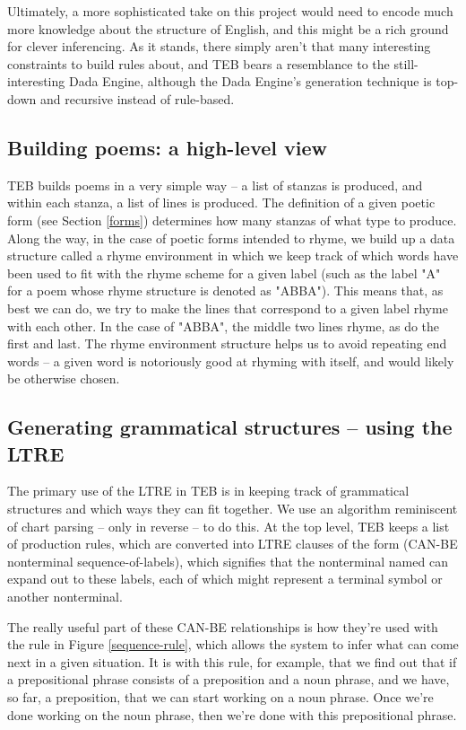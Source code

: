 \documentclass[12pt]{article}
\begin{document}
Ultimately, a more sophisticated take on this project would need to
encode much more knowledge about the structure of English, and this might
be a rich ground for clever inferencing. As it stands, there simply aren't
that many interesting constraints to build rules about, and TEB bears a
resemblance to the still-interesting Dada Engine\cite{dadaengine},
although the Dada Engine's generation technique is top-down and recursive
instead of rule-based.

\subsection{Building poems: a high-level view}
TEB builds poems in a very simple way -- a list of stanzas is produced, and
within each stanza, a list of lines is produced. The definition of a given
poetic form (see Section \ref{forms}) determines how many stanzas of what
type to produce. Along the way, in the case of poetic forms intended to
rhyme, we build up a data structure called a rhyme environment in which we
keep track of which words have been used to fit with the rhyme scheme for a
given label (such as the label "A" for a poem whose rhyme structure is
denoted as "ABBA"). This means that, as best we can do, we try to make the
lines that correspond to a given label rhyme with each other. In the case
of "ABBA", the middle two lines rhyme, as do the first and last. The rhyme
environment structure helps us to avoid repeating end words -- a given word
is notoriously good at rhyming with itself, and would likely be otherwise
chosen.

\subsection{Generating grammatical structures -- using the LTRE}
\label{generating}
The primary use of the LTRE in TEB is in keeping track of grammatical
structures and which ways they can fit together. We use an algorithm
reminiscent of chart parsing -- only in reverse -- to do this. At the top
level, TEB keeps a list of production rules, which are converted into LTRE
clauses of the form (CAN-BE nonterminal sequence-of-labels), which
signifies that the nonterminal named can expand out to these labels, each
of which might represent a terminal symbol or another nonterminal.

\bigskip
The really useful part of these CAN-BE relationships is how they're used
with the rule in Figure \ref{sequence-rule}, which allows the system to
infer what can come next in a given situation. It is with this rule, for
example, that we find out that if a prepositional phrase consists of a
preposition and a noun phrase, and we have, so far, a preposition, that we
can start working on a noun phrase. Once we're done working on the noun
phrase, then we're done with this prepositional phrase.
\end{document}
